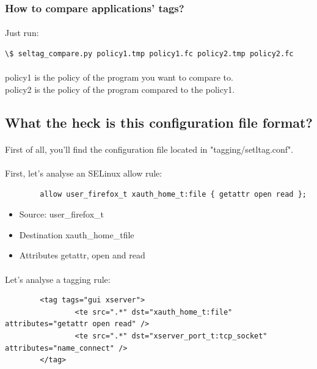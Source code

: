\subsubsection*{How to compare applications' tags?}
\paragraph*{}
Just run:
\begin{verbatim}
\$ seltag_compare.py policy1.tmp policy1.fc policy2.tmp policy2.fc
\end{verbatim}
 
\paragraph*{}
policy1 is the policy of the program you want to compare to.\\
policy2 is the policy of the program compared to the policy1.

\subsection*{What the heck is this configuration file format?}
\paragraph*{}
First of all, you'll find the configuration file located in "tagging/setltag.conf".

\paragraph*{}
First, let's analyse an SELinux allow rule:
\begin{verbatim}
        allow user_firefox_t xauth_home_t:file { getattr open read };
\end{verbatim}

\begin{itemize}
 \item Source: user\_firefox\_t
 \item Destination\: xauth\_home\_t\:file
 \item Attributes\: getattr, open and read
\end{itemize}

\paragraph*{}
Let's analyse a tagging rule:
\begin{verbatim}
        <tag tags="gui xserver">
                <te src=".*" dst="xauth_home_t:file" attributes="getattr open read" />
                <te src=".*" dst="xserver_port_t:tcp_socket" attributes="name_connect" />
        </tag>
\end{verbatim}

